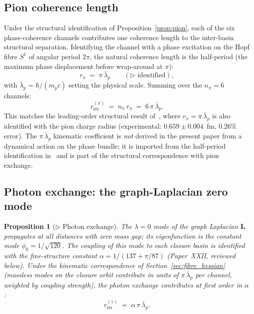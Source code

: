 \documentclass[12pt]{article}
\newtheorem{proposition}[theorem]{Proposition}
\newcommand{\lbar}{\bar{\lambda}}
\begin{document}
\subsection{Pion coherence length}\label{sec:pion_coherence}

Under the structural identification of Proposition~\ref{prop:pion},
each of the six phase-coherence channels contributes one coherence
length to the inter-basin structural separation. Identifying the
channel with a phase excitation on the Hopf fibre $S^1$ of angular
period $2\pi$, the natural coherence length is the half-period
(the maximum phase displacement before wrap-around at $\pi$):
\begin{equation}\label{eq:r_pi_hp}
    r_\pi \;=\; \pi\,\lbar_p \qquad (\triangleright\text{ identified}),
\end{equation}
with $\lbar_p = \hbar/(m_p c)$ setting the physical scale. Summing
over the $n_\pi = 6$ channels:
\begin{equation}\label{eq:r_pion}
    r_{\mathrm{str}}^{(\pi)} \;=\; n_\pi\,r_\pi \;=\; 6\,\pi\,\lbar_p.
\end{equation}
This matches the leading-order structural result
of~\citet{SmartRadius}, where $r_\pi = \pi\,\lbar_p$ is also
identified with the pion charge radius (experimental:
$0.659 \pm 0.004$~fm, 0.26\% error). The $\pi\,\lbar_p$ kinematic
coefficient is \textit{not} derived in the present paper from a
dynamical action on the phase bundle; it is imported from the
half-period identification in~\citep{SmartRadius} and is part of
the structural correspondence with pion exchange.

\subsection{Photon exchange: the graph-Laplacian zero mode}\label{sec:photon_exchange}

\begin{proposition}[$\triangleright$ Photon exchange]\label{prop:photon}
The $\lambda = 0$ mode of the graph Laplacian $\mathbf{L}$ propagates at
all distances with zero mass gap; its eigenfunction is the constant
mode $\phi_0 = 1/\sqrt{120}$. The coupling of this mode to each closure
basin is identified with the fine-structure constant $\alpha = 1/(137 +
\pi/87)$ (Paper~XXII, reviewed below). Under the kinematic
correspondence of Section~\ref{sec:fibre_hessian} (massless modes on
the closure orbit contribute in units of $\pi\,\lbar_p$ per channel,
weighted by coupling strength), the photon exchange contributes at
first order in $\alpha$:
\begin{equation}\label{eq:r_photon}
    r_{\mathrm{str}}^{(\gamma)} \;=\; \alpha\,\pi\,\lbar_p.
\end{equation}
\end{proposition}
\end{document}
